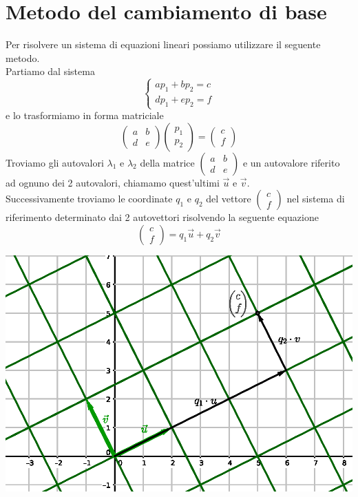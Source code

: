 \documentclass[10pt,a4paper]{article}
\theoremstyle{plain}
\theoremstyle{definition}
\begin{document}
\section{Metodo del cambiamento di base}
Per risolvere un sistema di equazioni lineari possiamo utilizzare il seguente metodo. \\
Partiamo dal sistema
\[
\begin{cases*}
	ap_1 + bp_2 = c \\
	dp_1 + ep_2 = f
\end{cases*}
\]
e lo trasformiamo in forma matriciale
\[
\begin{pmatrix}
	a & b \\
	d & e
\end{pmatrix}
\begin{pmatrix}
	p_1 \\
	p_2
\end{pmatrix}
= \begin{pmatrix}
	c \\
	f
\end{pmatrix}
\]
Troviamo gli autovalori $\lambda_1$ e $\lambda_2$ della matrice $\begin{pmatrix}
a & b \\
d & e
\end{pmatrix}$ e un autovalore riferito ad ognuno dei 2 autovalori, chiamamo quest'ultimi $\vec{u}$ e $\vec{v}$. \\
Successivamente troviamo le coordinate $q_1$ e $q_2$ del vettore $\begin{pmatrix}
c \\
f
\end{pmatrix}$ nel sistema di riferimento determinato dai 2 autovettori risolvendo la seguente equazione
\[
\begin{pmatrix}
c \\
f
\end{pmatrix}=q_1\vec{u} + q_2\vec{v}
\]
\begin{center}
	\includegraphics[scale=0.7]{cambio_base.eps}
\end{center}
\end{document}
